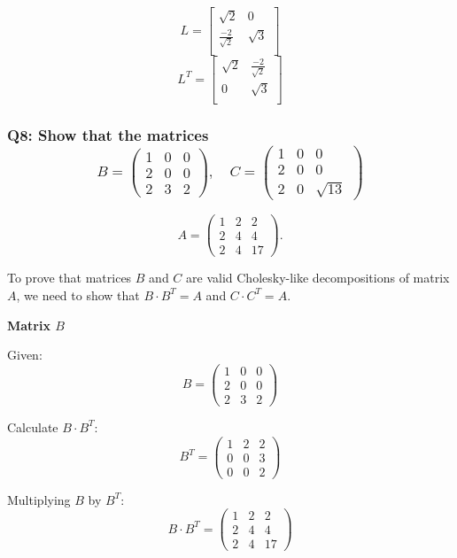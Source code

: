 \documentclass{article}
\begin{document}
\[
   L=
  \left[ {\begin{array}{cc}
   \sqrt{2} & 0 \\
    \frac{-2}{\sqrt{2}} & \sqrt{3} \\
  \end{array} } \right]
\]
\[
   L^T=
  \left[ {\begin{array}{cc}
   \sqrt{2} & \frac{-2}{\sqrt{2}} \\
    0 & \sqrt{3} \\
  \end{array} } \right]
\]

\subsubsection*{Q8: Show that the matrices
\[ B = \begin{pmatrix} 1 & 0 & 0 \\ 2 & 0 & 0 \\ 2 & 3 & 2 \end{pmatrix}, \quad C = \begin{pmatrix} 1 & 0 & 0 \\ 2 & 0 & 0 \\ 2 & 0 & \sqrt{13} \end{pmatrix} \]
}
\[ A = \begin{pmatrix} 1 & 2 & 2 \\ 2 & 4 & 4 \\ 2 & 4 & 17 \end{pmatrix}. \]

To prove that matrices \(B\) and \(C\) are valid Cholesky-like decompositions of matrix \(A\), we need to show that \(B \cdot B^T = A\) and \(C \cdot C^T = A\). 

\textbf{Matrix \(B\)}

Given:
\[ B = \begin{pmatrix} 1 & 0 & 0 \\ 2 & 0 & 0 \\ 2 & 3 & 2 \end{pmatrix} \]

Calculate \(B \cdot B^T\):
\[ B^T = \begin{pmatrix} 1 & 2 & 2 \\ 0 & 0 & 3 \\ 0 & 0 & 2 \end{pmatrix} \]

Multiplying \(B\) by \(B^T\):
\[ B \cdot B^T = \begin{pmatrix} 1 & 2 & 2 \\ 2 & 4 & 4 \\ 2 & 4 & 17 \end{pmatrix} \]
\end{document}
